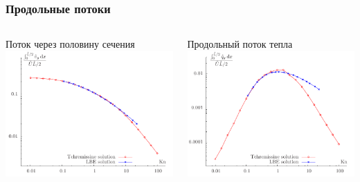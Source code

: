 \documentclass[ucs]{beamer}
\begin{document}
\begin{frame}
	\frametitle{Продольные потоки}
	\begin{columns}
		\begin{center}
			Поток через половину сечения\\
			\includegraphics[width=\textwidth]{pics/couette_flow}
		\end{center}
		\begin{center}
			Продольный поток тепла\\
			\includegraphics[width=\textwidth]{pics/couette_qflow}
		\end{center}
	\end{columns}
\end{frame}
\end{document}
